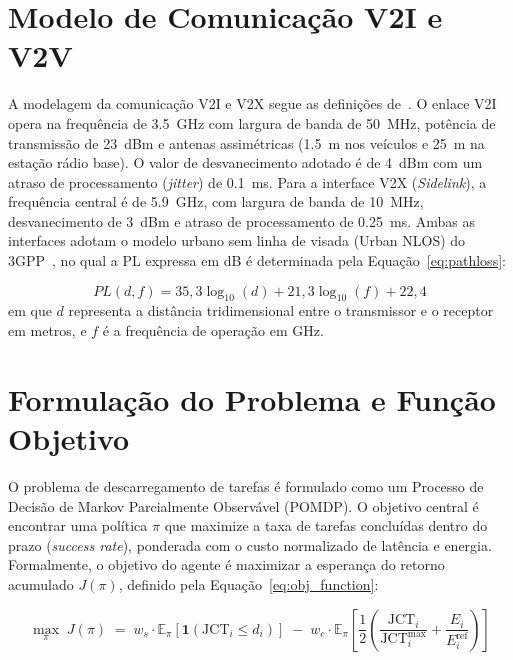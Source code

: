 \section{Modelo de Comunicação \gls{V2I} e \gls{V2V}}

A modelagem da comunicação \gls{V2I} e \gls{V2X} segue as definições de~\cite{3gpp38901, yan2024towards}. O enlace \gls{V2I} opera na frequência de \SI{3.5}{\giga\hertz} com largura de banda de \SI{50}{\mega\hertz}, potência de transmissão de \SI{23}{dBm} e antenas assimétricas (\SI{1,5}{\meter} nos veículos e \SI{25}{\meter} na estação rádio base). O valor de desvanecimento adotado é de \SI{4}{dBm} com um atraso de processamento (\textit{jitter}) de \SI{0,1}{\milli\second}. Para a interface \gls{V2X} (\textit{Sidelink}), a frequência central é de \SI{5.9}{\giga\hertz}, com largura de banda de \SI{10}{\mega\hertz}, desvanecimento de \SI{3}{dBm} e atraso de processamento de \SI{0,25}{\milli\second}. Ambas as interfaces adotam o modelo urbano sem linha de visada (Urban NLOS) do 3GPP~\cite{3gpp38901}, no qual a \gls{PL} expressa em dB é determinada pela Equação~\ref{eq:pathloss}:

\begin{equation}
\label{eq:pathloss}
PL(d, f) = 35{,}3 \log_{10}(d) + 21{,}3 \log_{10}(f) + 22{,}4
\end{equation}
em que $d$ representa a distância tridimensional entre o transmissor e o receptor em metros, e $f$ é a frequência de operação em \unit{\giga\hertz}.

\section{Formulação do Problema e Função Objetivo}

O problema de descarregamento de tarefas é formulado como um Processo de Decisão de Markov Parcialmente Observável (POMDP). O objetivo central é encontrar uma política $\pi$ que maximize a taxa de tarefas concluídas dentro do prazo (\textit{success rate}), ponderada com o custo normalizado de latência e energia. Formalmente, o objetivo do agente é maximizar a esperança do retorno acumulado $J(\pi)$, definido pela Equação~\ref{eq:obj_function}:

\begin{equation}
\label{eq:obj_function}
\max_{\pi}\; J(\pi) \;=\; w_s \cdot \mathbb{E}_\pi\!\left[\mathbf{1}(\text{JCT}_i \leq d_i)\right] \;-\; w_c \cdot \mathbb{E}_\pi\!\left[\frac{1}{2}\!\left(\frac{\text{JCT}_i}{\text{JCT}^{\max}_i} + \frac{E_i}{E^{\text{ref}}_i}\right)\right]
\end{equation}

